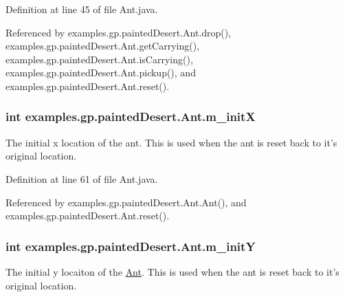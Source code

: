 Definition at line 45 of file Ant.\-java.



Referenced by examples.\-gp.\-painted\-Desert.\-Ant.\-drop(), examples.\-gp.\-painted\-Desert.\-Ant.\-get\-Carrying(), examples.\-gp.\-painted\-Desert.\-Ant.\-is\-Carrying(), examples.\-gp.\-painted\-Desert.\-Ant.\-pickup(), and examples.\-gp.\-painted\-Desert.\-Ant.\-reset().

\hypertarget{classexamples_1_1gp_1_1painted_desert_1_1_ant_a51306678c174f4302bfc7465f02c6f1e}{
\subsubsection[{m\-\_\-init\-X}]{\setlength{\rightskip}{0pt plus 5cm}int examples.\-gp.\-painted\-Desert.\-Ant.\-m\-\_\-init\-X\hspace{0.3cm}{\ttfamily [private]}}}\label{classexamples_1_1gp_1_1painted_desert_1_1_ant_a51306678c174f4302bfc7465f02c6f1e}
The initial x location of the ant. This is used when the ant is reset back to it's original location. 

Definition at line 61 of file Ant.\-java.



Referenced by examples.\-gp.\-painted\-Desert.\-Ant.\-Ant(), and examples.\-gp.\-painted\-Desert.\-Ant.\-reset().

\hypertarget{classexamples_1_1gp_1_1painted_desert_1_1_ant_a0745688b88023853cc28d8145ee7dde6}{
\subsubsection[{m\-\_\-init\-Y}]{\setlength{\rightskip}{0pt plus 5cm}int examples.\-gp.\-painted\-Desert.\-Ant.\-m\-\_\-init\-Y\hspace{0.3cm}{\ttfamily [private]}}}\label{classexamples_1_1gp_1_1painted_desert_1_1_ant_a0745688b88023853cc28d8145ee7dde6}
The initial y locaiton of the \hyperlink{classexamples_1_1gp_1_1painted_desert_1_1_ant}{Ant}. This is used when the ant is reset back to it's original location. 

